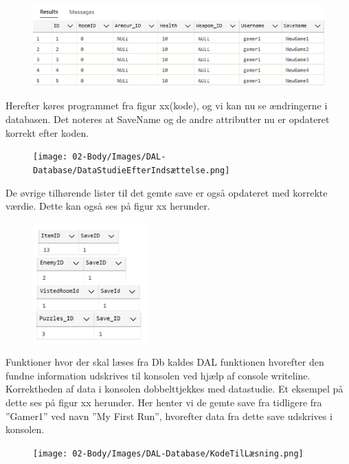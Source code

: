 \begin{figure}[H]
\centering
\includegraphics[width = \textwidth]{02-Body/Images/DAL-Database/DatastudieFørIndsættelse.png}
\caption{}
\label{fig:}
\end{figure}

Herefter køres programmet fra figur xx(kode), og vi kan nu se ændringerne i databasen.
Det noteres at SaveName og de andre attributter nu er opdateret korrekt efter koden.

\begin{figure}[H]
\centering
\texttt{[image: 02-Body/Images/DAL-Database/DataStudieEfterIndsættelse.png]}
\caption{}
\label{fig:}
\end{figure}

De øvrige tilhørende lister til det gemte save er også opdateret med korrekte værdie. Dette kan også ses på figur xx herunder.

\begin{figure}[H]
\centering
\includegraphics[width = 0.4\textwidth]{02-Body/Images/DAL-Database/Lister.png}
\caption{}
\label{fig:}
\end{figure}

Funktioner hvor der skal læses fra Db kaldes DAL funktionen hvorefter den fundne information udskrives til konsolen ved hjælp af console writeline. Korrektheden af data i konsolen dobbelttjekkes med datastudie.
Et eksempel på dette ses på figur xx herunder.
Her henter vi de gemte save fra tidligere fra ”Gamer1” ved navn ”My First Run”, hvorefter data fra dette save udskrives i konsolen.

\begin{figure}[H]
\centering
\texttt{[image: 02-Body/Images/DAL-Database/KodeTilLæsning.png]}
\caption{}
\label{fig:KodeTilLæsningAfSave}
\end{figure}

